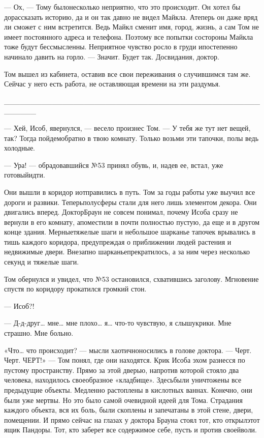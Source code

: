 — Ох, — Тому былонесколько неприятно, что это происходит. Он хотел бы дорассказать историю, да и он так давно не видел Майкла. Атеперь он даже вряд ли сможет с ним встретится. Ведь Майкл сменит имя, город, жизнь, а сам Том не имеет постоянного адреса и телефона. Поэтому все попытки состороны Майкла тоже будут бессмысленны. Неприятное чувство росло в груди ипостепенно начинало давить на горло. — Значит. Будет так. Досвидания, доктор.

Том вышел из кабинета, оставив все свои переживания о случившимся там же. Сейчас у него есть работа, не оставляющая времени на эти раздумья.

______________________________________________________

— Хей, Исоб, явернулся, — весело произнес Том. — У тебя же тут нет вещей, так? Тогда пойдемобратно в твою комнату. Только возьми эти тапочки, полы ведь холодные.

— Ура! — обрадовавшийся №53 принял обувь, и, надев ее, встал, уже готовыйидти.

Они вышли в коридор иотправились в путь. Том за годы работы уже выучил все дороги и развики. Теперьполусферы стали для него лишь элементом декора. Они двигались вперед. ДокторБраун не совсем понимал, почему Исоба сразу не вернули в его комнату, апоместили в почти полностью пустую, да еще и в другом конце здания. Мерныетяжелые шаги и небольшое шарканье тапочек врывались в тишь каждого коридора, предупреждая о приближении людей растения и недвижимые двери. Внезапно шарканьепрекратилось, а за ним через несколько секунд и тяжелые шаги.

Том обернулся и увидел, что №53 остановился, схватившись заголову. Мгновение спустя по коридору прокатился громкий стон.

— Исоб?!

— Д-д-друг… мне… мне плохо… я… что-то чувствую, я слышукрики. Мне страшно. Мне больно.

«Что… что происходит? — мысли хаотичноносились в голове доктора. — Черт. Черт. ЧЕРТ!» — Том понял, где они находятся. Крик Исоба эхом разнесся по пустому пространству. Прямо за этой дверью, напротив которой стояло два человека, находилось своеобразное «кладбище». Здесьбыли уничтожены все предыдущие объекты. Медленно растоплены в кислотных ваннах. Конечно, они были уже мертвы. Но это было самой очевидной идеей для Тома. Страдания каждого объекта, вся их боль, были скоплены и запечатаны в этой стене, двери, помещении. И прямо сейчас на глазах у доктора Брауна стоял тот, кто открылэтот ящик Пандоры. Тот, кто заберет все содержимое себе, пусть и против своейволи.

